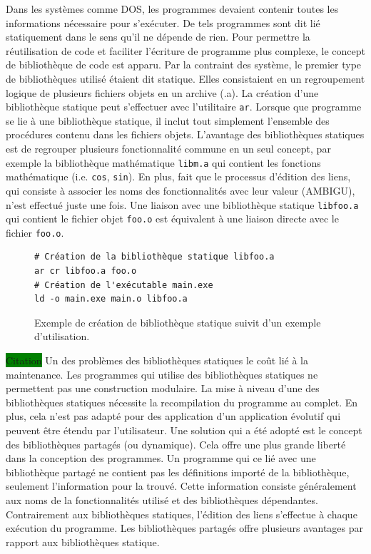 \documentclass[12pt,initial,twoside,maitrise]{dms}
\newcommand{\todo}[1]{\noindent\colorbox{green}{#1\hspace{\textwidth}}}
\numberwithin{equation}{section}
\numberwithin{table}{chapter}
\numberwithin{figure}{chapter}
\begin{document}
Dans les systèmes comme DOS, les programmes devaient contenir toutes les
informations nécessaire pour s'exécuter. De tels programmes sont dit lié
statiquement dans le sens qu'il ne dépende de rien. Pour permettre la
réutilisation de code et faciliter l'écriture de programme plus complexe,
le concept de bibliothèque de code est apparu. Par la contraint des
système, le premier type de bibliothèques utilisé étaient dit statique.
Elles consistaient en un regroupement logique de plusieurs fichiers objets en
un archive (.a). La création d'une bibliothèque statique peut s'effectuer avec
l'utilitaire \verb|ar|. Lorsque que programme se lie à une bibliothèque
statique, il inclut tout simplement l'ensemble des procédures contenu dans les
fichiers objets. L'avantage des bibliothèques statiques est de regrouper
plusieurs fonctionnalité commune en un seul concept, par exemple la
bibliothèque mathématique \verb|libm.a| qui contient les fonctions mathématique
(i.e. \verb|cos|, \verb|sin|).  En plus,  fait que le processus d'édition des
liens, qui consiste à associer les noms des fonctionnalités avec leur valeur (AMBIGU), n'est
effectué juste une fois. Une liaison avec une bibliothèque statique
\verb|libfoo.a| qui contient le fichier objet \verb|foo.o| est équivalent à une
liaison directe avec le fichier \verb|foo.o|.

\begin{figure}[ht]
    \begin{minipage}[t]{0.5\textwidth}
\begin{verbatim}
# Création de la bibliothèque statique libfoo.a
ar cr libfoo.a foo.o
# Création de l'exécutable main.exe
ld -o main.exe main.o libfoo.a
\end{verbatim}
    \end{minipage}

    \caption{Exemple de création de bibliothèque statique suivit d'un exemple
    d'utilisation.}
\end{figure}


\todo{Citation}
Un des problèmes des bibliothèques statiques le coût lié à la maintenance.  Les
programmes qui utilise des bibliothèques statiques ne permettent pas une
construction modulaire. La mise à niveau d'une des bibliothèques statiques
nécessite la recompilation du programme au complet. En plus, cela n'est pas
adapté pour des application d'un application évolutif qui peuvent être étendu
par l'utilisateur. Une solution qui a été adopté est le
concept des bibliothèques partagés (ou dynamique). Cela offre une plus grande
liberté dans la conception des programmes. Un programme qui ce lié avec une
bibliothèque partagé ne contient pas les définitions importé de la
bibliothèque, seulement l'information pour la trouvé. Cette information
consiste généralement aux noms de la fonctionnalités utilisé et des
bibliothèques dépendantes. Contrairement aux bibliothèques statiques,
l'édition des liens s'effectue à chaque exécution du programme.
Les bibliothèques partagés offre plusieurs avantages par rapport
aux bibliothèques statique.
\end{document}
